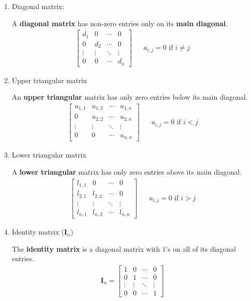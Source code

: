 \documentclass[11pt]{article}
\newcommand{\keyphrase}{\textbf}
\newcommand{\mat}[1]{\mathbf{#1}}
\begin{document}
\begin{enumerate}
\item{
Diagonal matrix:

A \keyphrase{diagonal matrix} has non-zero entries only on its \keyphrase{main diagonal}.
\begin{align*}
\begin{bmatrix}
d_1 & 0 & \cdots & 0 \\
0 & d_2 & \cdots & 0 \\
\vdots & \vdots & \ddots & \vdots \\
0 & 0 & \cdots & d_n
\end{bmatrix}
&&
a_{i,j} = 0 \text{ if $i \neq j$}
\end{align*}
}
\item{
Upper triangular matrix

An \keyphrase{upper triangular} matrix has only zero entries below its main diagonal.
\begin{align*}
\begin{bmatrix}
u_{1,1} & u_{1,2} & \cdots & u_{1,n} \\
0 & u_{2,2} & \cdots & u_{2,n} \\
\vdots & \vdots & \ddots & \vdots \\
0 & 0 & \cdots & u_{n,n}
\end{bmatrix}
&&
u_{i,j} = 0 \text{ if $i < j$}
\end{align*}
}
\item{
Lower triangular matrix

A \keyphrase{lower triangular} matrix has only zero entries above its main diagonal.
\begin{align*}
\begin{bmatrix}
l_{1,1} & 0 & \cdots & 0 \\
l_{2,1} & l_{2,2} & \cdots & 0 \\
\vdots & \vdots & \ddots & \vdots \\
l_{n,1} & l_{n,2} & \cdots & l_{n,n}
\end{bmatrix}
&&
u_{i,j} = 0 \text{ if $i > j$}
\end{align*}
}
\item{
Identity matrix ($\mat{I}_n$)

The \keyphrase{identity matrix} is a diagonal matrix with $1$'s on all of its diagonal entries.
\begin{align*}
\mat{I}_n = \begin{bmatrix}
1 & 0 & \cdots & 0 \\
0 & 1 & \cdots & 0 \\
\vdots & \vdots & \ddots & \vdots \\
0 & 0 & \cdots & 1
\end{bmatrix}
\end{align*}

}
\end{enumerate}
\end{document}
